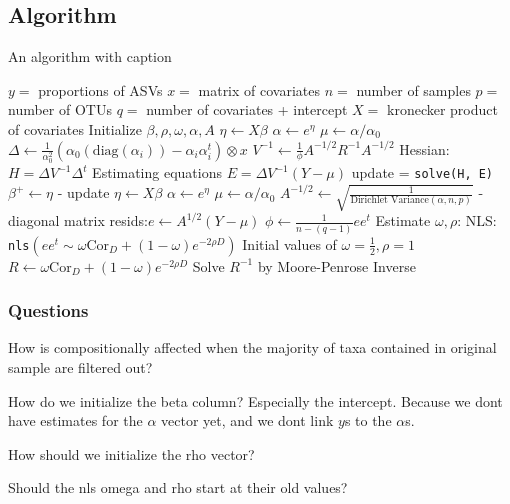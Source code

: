 \documentclass[10pt]{article}
\begin{document}
\subsection*{Algorithm}

\begin{algorithm}
\caption{An algorithm with caption}\label{alg:cap}
\begin{algorithmic}
\State $y = $ proportions of ASVs
\State $x = $ matrix of covariates
\State $n = $ number of samples
\State $p = $ number of OTUs
\State $q = $ number of covariates + intercept
\State $X = $ kronecker product of covariates
\State Initialize $\beta, \rho, \omega, \alpha, A$
\Loop
  \Loop
  \State $\eta \gets X \beta$
  \State $\alpha \gets e^\eta$
  \State $\mu \gets \alpha/\alpha_0$
  \State $\Delta \gets \frac{1}{\alpha_0^2} ( \alpha_0(\text{diag}(\alpha_i)) - \alpha_i \alpha_i^t ) \otimes x $
  \State $V^{-1} \gets \frac{1}{\phi} A^{-1/2} R^{-1} A^{-1/2}$
  \State Hessian: $H = \Delta V ^{-1} \Delta^t$
  \State Estimating equations $E = \Delta V ^{-1}(Y - \mu)$
  \State update = \texttt{solve(H, E)}
  \State $\beta^+ \gets \eta$ - update
  \EndLoop
  \State $\eta \gets X \beta$
  \State $\alpha \gets e^\eta$
  \State $\mu \gets \alpha/\alpha_0$
  \State $A^{-1/2} \gets \sqrt{\frac{1}{\text{Dirichlet Variance}(\alpha,n,p)}}$ - diagonal matrix
  \State resids:$e \gets A^{1/2}(Y - \mu)$
  \State $\phi \gets \frac{1}{n-(q-1)} e e^t$
  \State Estimate $\omega, \rho$: NLS: \texttt{nls}$(e e^t \sim \omega \text{Cor}_D + (1 - \omega)e^{-2\rho D})$
  Initial values of $\omega = \tfrac{1}{2}, \rho = 1$
  \State $R \gets \omega\text{Cor}_D + (1 - \omega)e^{-2\rho D}$
  \State Solve $R ^{-1} $ by Moore-Penrose Inverse

\EndLoop
\end{algorithmic}
\end{algorithm}

\subsubsection*{Questions}
How is compositionally affected when the majority of taxa contained in original sample are filtered out?

How do we initialize the beta column? Especially the intercept. Because we dont have estimates for the $\alpha$ vector yet, and we dont link $y$s to the $\alpha$s.

How should we initialize the rho vector?

Should the nls omega and rho start at their old values?
\end{document}
